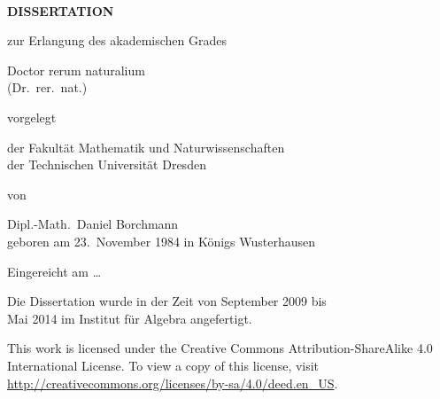 
~\cleardoublepage

\begin{center}
  \vfill{}

  \Huge\makeatletter{\textbf{\@title}}\makeatother

  \vfill{}

  \LARGE
  \textbf{D\;I\;S\;S\;E\;R\;T\;A\;T\;I\;O\;N}

  \vspace*{2ex}
  zur Erlangung des akademischen Grades
  \vspace*{2ex}

  Doctor rerum naturalium \\
  (Dr.\ rer.\ nat.)

  \vfill

  vorgelegt

  \vfill

  der Fakultät Mathematik und Naturwissenschaften\\
  der Technischen Universität Dresden

  \vfill

  von

  \vfill

  {\large
    Dipl.-Math.\ Daniel Borchmann\\
    \vspace*{.7ex}
    geboren am 23.\ November 1984 in Königs Wusterhausen
  }

  \vfill

  Eingereicht am \dots

  \vfill

  \large

  Die Dissertation wurde in der Zeit von September 2009 bis\\
  Mai 2014 im Institut für Algebra angefertigt.
\end{center}

\newpage

\vspace*{\fill}

\noindent%
This work is licensed under the Creative Commons Attribution-ShareAlike 4.0 International
License. To view a copy of this license, visit
\url{http://creativecommons.org/licenses/by-sa/4.0/deed.en_US}.


